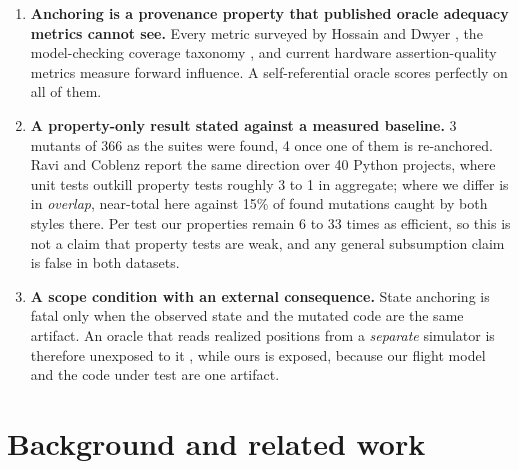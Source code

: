 \documentclass[12pt]{article}
\begin{document}
\begin{enumerate}
      the recovered mutants lie in that producer and none in the region the
      oracle exists to test. This also discriminates anchoring from the obvious
      rival explanation, propagation distance, which predicts no difference
      between the two cells because the oracle and the code producing its anchor
      are identically placed in both. Section~\ref{sec:distance} sets that
      comparison out.
\item \textbf{Anchoring is a provenance property that published oracle adequacy
      metrics cannot see.} Every metric surveyed by Hossain and Dwyer
      \cite{hossain2023}, the model-checking coverage taxonomy
      \cite{chockler2006fmsd}, and current hardware assertion-quality metrics
      \cite{witharana2022} measure forward influence. A self-referential oracle
      scores perfectly on all of them.
\item \textbf{A property-only result stated against a measured
      baseline.} 3 mutants of 366 as the suites were found, 4 once one of
      them is re-anchored. Ravi and Coblenz \cite{ravi2025} report
      the same direction over 40 Python projects, where unit tests outkill
      property tests roughly 3 to 1 in aggregate; where we differ is in
      \emph{overlap}, near-total here against 15\% of found mutations
      caught by both styles there. Per test our properties remain 6 to 33 times
      as efficient, so this is not a claim that property tests are weak, and any
      general subsumption claim is false in both datasets.
\item \textbf{A scope condition with an external consequence.} State anchoring is
      fatal only when the observed state and the mutated code are the same
      artifact. An oracle that reads realized positions from a \emph{separate}
      simulator is therefore unexposed to it \cite{li2024}, while ours is exposed,
      because our flight model and the code under test are one artifact.
\end{enumerate}

\section{Background and related work}
\end{document}
